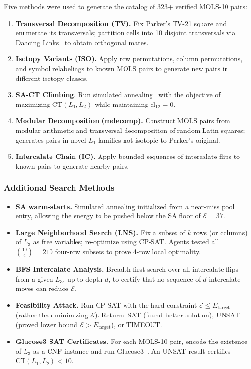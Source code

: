 \documentclass[11pt,a4paper]{article}
\theoremstyle{remark}
\newcommand{\CT}{\mathrm{CT}}
\newcommand{\cl}{\mathrm{cl}}
\newcommand{\E}{\mathcal{E}}
\begin{document}
Five methods were used to generate the catalog of 323+ verified MOLS-10 pairs:

\begin{enumerate}
  \item \textbf{Transversal Decomposition (TV).} Fix Parker's TV-21 square and enumerate
    its transversals; partition cells into 10 disjoint transversals via Dancing
    Links~\cite{knuth2000} to obtain orthogonal mates.
  \item \textbf{Isotopy Variants (ISO).} Apply row permutations, column permutations, and
    symbol relabelings to known MOLS pairs to generate new pairs in different isotopy
    classes.
  \item \textbf{SA-CT Climbing.} Run simulated annealing~\cite{geyer1991} with the
    objective of maximizing $\CT(L_1, L_2)$ while maintaining $\cl_{12} = 0$.
  \item \textbf{Modular Decomposition (mdecomp).} Construct MOLS pairs from modular
    arithmetic and transversal decomposition of random Latin squares; generates pairs in
    novel $L_1$-families not isotopic to Parker's original.
  \item \textbf{Intercalate Chain (IC).} Apply bounded sequences of intercalate flips to
    known pairs to generate nearby pairs.
\end{enumerate}

\subsubsection{Additional Search Methods}

\begin{itemize}
  \item \textbf{SA warm-starts.} Simulated annealing initialized from a near-miss pool
    entry, allowing the energy to be pushed below the SA floor of $\E=37$.
  \item \textbf{Large Neighborhood Search (LNS).} Fix a subset of $k$ rows (or columns) of
    $L_3$ as free variables; re-optimize using CP-SAT. Agents tested all $\binom{10}{4}=210$
    four-row subsets to prove 4-row local optimality.
  \item \textbf{BFS Intercalate Analysis.} Breadth-first search over all intercalate flips
    from a given $L_3$, up to depth $d$, to certify that no sequence of $d$ intercalate
    moves can reduce $\E$.
  \item \textbf{Feasibility Attack.} Run CP-SAT with the hard constraint
    $\E \leq E_{\text{target}}$ (rather than minimizing $\E$). Returns SAT (found better
    solution), UNSAT (proved lower bound $\E > E_{\text{target}}$), or TIMEOUT.
  \item \textbf{Glucose3 SAT Certificates.} For each MOLS-10 pair, encode the existence
    of $L_3$ as a CNF instance and run Glucose3~\cite{audemard2009}. An UNSAT result
    certifies $\CT(L_1, L_2) < 10$.
\end{itemize}
\end{document}
